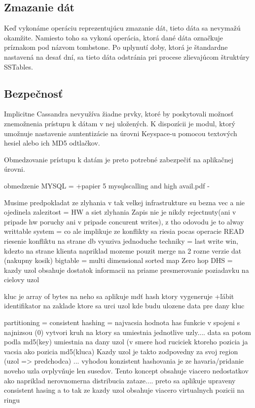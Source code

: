 \documentclass[11pt,twoside,a4paper]{book}
\begin{document}
\subsection{Zmazanie dát}
Keď vykonáme operáciu reprezentujúcu zmazanie dát, tieto dáta sa nevymažú okamžite. Namiesto toho sa vykoná operácia, ktorá dané dáta označkuje príznakom pod názvom tombstone. Po uplynutí doby, ktorá je štandardne nastavená na desať dní, sa tieto dáta odstránia pri procese zlievajúcom štruktúry SSTables.


\subsection{Bezpečnosť}

Implicitne Cassandra nevyužíva žiadne prvky, ktoré by poskytovali možnosť znemožnenia prístupu k dátam v nej uložených. K dispozícii je modul, ktorý umožnuje nastavenie auntentizácie na úrovni Keyspace-u pomocou textových hesiel alebo ich MD5 odtlačkov. 

Obmedzovanie prístupu k datám je preto potrebné zabezpečiť na aplikačnej úrovni.




obmedzenie MYSQL = +papier 5
mysqlscalling and high avail.pdf -



Musime predpokladat ze zlyhania v tak velkej infrastrukture su bezna vec a nie ojedinela zalezitost = HW a siet zlyhania
Zapis nie je nikdy rejectnuty(ani v pripade hw poruchy ani v pripade concurent writes),  z tho odovodu je to alway writtable system = co ale implikuje ze konflikty sa riesia pocas operacie READ
  riesenie konfliktu na strane db vyuziva jednoduche techniky = last write win, kdezto na strane klienta napriklad mozeme pouzit merge na 2 rozne verzie dat (nakupny kosik)
bigtable = multi dimensional sorted map
Zero hop DHS = kazdy uzol obsahuje dostatok informacii na priame presmerovanie poziadavku na cielovy uzol 

kluc je array of bytes na neho sa aplikuje mdť hash ktory vygeneruje +ľábit identifikator na zaklade ktore sa urci uzol kde budu ulozene data pre dany kluc

partitioning = consistent hashing = najvacsia hodnota has funkcie v spojeni s najnizsou (0) vytvori kruh na ktory sa umiestnia jednotlive uzly.... data sa potom podla md5(key) umiestnia na dany uzol (v smere hod ruciciek ktoreho  pozicia ja vacsia ako pozicia md5(kluca) Kazdy uzol je takto zodpovedny za svoj region (uzol => predchodca) ... vyhodou konzistent hashovania je ze havaria/pridanie noveho uzla ovplyvňuje len susedov. Tento koncept obsahuje viacero nedostatkov ako napriklad nerovnomerna distribucia zataze.... 
preto sa aplikuje upraveny consistent hasing a to tak ze kazdy uzol obsahuje viacero virtualnych pozicii na ringu
\end{document}
